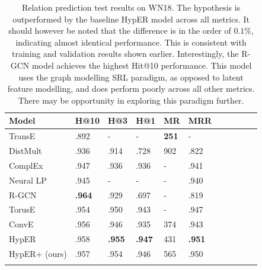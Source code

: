 \bigskip
\bigskip
\bigskip
\bigskip



\begin{table}[H]
		\centering
		\begin{tabular}{lllllllllll}
  			\textbf{Model} & \textbf{H@10} & \textbf{H@3} & \textbf{H@1} & \textbf{MR} & \textbf{MRR} \\
  			\hline
  			TransE \unskip~\citep{bordes2013translating} & .892 & - & - & \textbf{251} & - \\
  			DistMult \unskip~\citep{yang2014embedding} & .936 & .914 & .728 & 902 & .822 \\
  			ComplEx \unskip~\citep{trouillon2016complex} & .947 & .936 & .936 & - & .941 \\
  			Neural LP \unskip~\citep{yang2017differentiable} & .945 & - & - & - & .940 \\
			R-GCN \unskip~\citep{schlichtkrull2018modeling} & \textbf{.964} & .929 & .697 & - & .819 \\
			TorusE \unskip~\citep{ebisu2018toruse} & .954 & .950 & .943 & - & .947 \\
			ConvE \unskip~\citep{dettmers2018convolutional} & .956 & .946 & .935 & 374 & .943 \\
			HypER \unskip~\citep{balazevic2019hypernetwork} & .958 & \textbf{.955} & \textbf{.947} & 431 & \textbf{.951} \\
  			\hline
  			HypER+ (ours) & .957 & .954 & .946 & 565 & .950 \\
			&
		\end{tabular}
		\captionsetup{justification=centering}
		\caption{Relation prediction test results on WN18. The hypothesis is outperformed by the baseline HypER model across all metrics. It should however be noted that the difference is in the order of $ 0.1\% $, indicating almost identical performance. This is consistent with training and validation results shown earlier. Interestingly, the R-GCN model achieves the highest Hit@10 performance. This model uses the graph modelling SRL paradigm, as opposed to latent feature modelling, and does perform poorly across all other metrics. There may be opportunity in exploring this paradigm further. }
\end{table}

